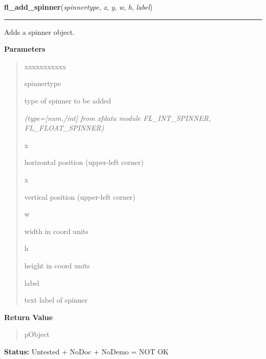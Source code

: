 \hspace{.8\funcindent}\begin{boxedminipage}{\funcwidth}

    \raggedright \textbf{fl\_add\_spinner}(\textit{spinnertype}, \textit{x}, \textit{y}, \textit{w}, \textit{h}, \textit{label})

    \vspace{-1.5ex}

    \rule{\textwidth}{0.5\fboxrule}
\setlength{\parskip}{2ex}
    Adds a spinner object.

\setlength{\parskip}{1ex}
      \textbf{Parameters}
      \vspace{-1ex}

      \begin{quote}
        \begin{Ventry}{xxxxxxxxxxx}

          \item[spinnertype]

          type of spinner to be added

            {\it (type=[num./int] from xfdata module FL\_INT\_SPINNER, FL\_FLOAT\_SPINNER)}

          \item[x]

          horizontal position (upper-left corner)

          \item[x]

          vertical position (upper-left corner)

          \item[w]

          width in coord units

          \item[h]

          height in coord units

          \item[label]

          text label of spinner

        \end{Ventry}

      \end{quote}

      \textbf{Return Value}
    \vspace{-1ex}

      \begin{quote}
      pObject

      \end{quote}

\textbf{Status:} Untested + NoDoc + NoDemo = NOT OK



    \end{boxedminipage}

